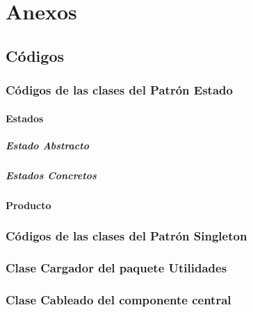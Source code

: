 \chapter*{Anexos}

\section{Códigos}


\subsection{Códigos de las clases del Patrón Estado}

\subsubsection*{Estados}
\paragraph*{Estado Abstracto}

\paragraph*{Estados Concretos}




\subsubsection*{Producto}


\subsection{Códigos de las clases del Patrón Singleton}



\subsection{Clase Cargador del paquete Utilidades}



\subsection{Clase Cableado del componente central}

